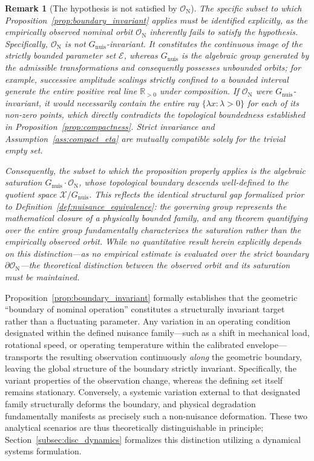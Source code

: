 \documentclass[a4paper]{cas-sc}
\newtheorem{remark}{Remark}
\newcommand{\EtaSpace}{\ensuremath{\mathcal{E}}}
\newcommand{\Gnuis}{\ensuremath{G_{\mathrm{nuis}}}}
\newcommand{\R}{\ensuremath{\mathbb{R}}}
\newcommand{\quotient}{\ensuremath{\mathcal{X}/G_{\mathrm{nuis}}}}
\begin{document}
\begin{remark}[The hypothesis is not satisfied by \(\mathcal{O}_{\mathrm N}\)]
\label{rem:orbit_not_invariant}
The specific subset to which Proposition~\ref{prop:boundary_invariant} applies must be identified explicitly, as the empirically observed nominal orbit \(\mathcal{O}_{\mathrm N}\) inherently fails to satisfy the hypothesis. Specifically, \(\mathcal{O}_{\mathrm N}\) is \emph{not} \(\Gnuis\)-invariant. It constitutes the continuous image of the strictly bounded parameter set \(\EtaSpace\), whereas \(\Gnuis\) is the algebraic group \emph{generated} by the admissible transformations and consequently possesses unbounded orbits; for example, successive amplitude scalings strictly confined to a bounded interval generate the entire positive real line \(\R_{>0}\) under composition. If \(\mathcal{O}_{\mathrm N}\) were \(\Gnuis\)-invariant, it would necessarily contain the entire ray \(\{\lambda x:\lambda>0\}\) for each of its non-zero points, which directly contradicts the topological boundedness established in Proposition~\ref{prop:compactness}. Strict invariance and Assumption~\ref{ass:compact_eta} are mutually compatible solely for the trivial empty set.

Consequently, the subset to which the proposition properly applies is the algebraic saturation \(\Gnuis\cdot\mathcal{O}_{\mathrm N}\), whose topological boundary descends well-defined to the quotient space \(\quotient\). This reflects the identical structural gap formalized prior to Definition~\ref{def:nuisance_equivalence}: the governing group represents the mathematical closure of a physically bounded family, and any theorem quantifying over the entire group fundamentally characterizes the saturation rather than the empirically observed orbit. While no quantitative result herein explicitly depends on this distinction---as no empirical estimate is evaluated over the strict boundary \(\partial\mathcal{O}_{\mathrm N}\)---the theoretical distinction between the observed orbit and its saturation must be maintained.
\end{remark}

Proposition~\ref{prop:boundary_invariant} formally establishes that the geometric ``boundary of nominal operation'' constitutes a structurally invariant target rather than a fluctuating parameter. Any variation in an operating condition designated within the defined nuisance family---such as a shift in mechanical load, rotational speed, or operating temperature within the calibrated envelope---transports the resulting observation continuously \emph{along} the geometric boundary, leaving the global structure of the boundary strictly invariant. Specifically, the variant properties of the observation change, whereas the defining set itself remains stationary. Conversely, a systemic variation external to that designated family structurally deforms the boundary, and physical degradation fundamentally manifests as precisely such a non-nuisance deformation. These two analytical scenarios are thus theoretically distinguishable in principle; Section~\ref{subsec:disc_dynamics} formalizes this distinction utilizing a dynamical systems formulation.
\end{document}
